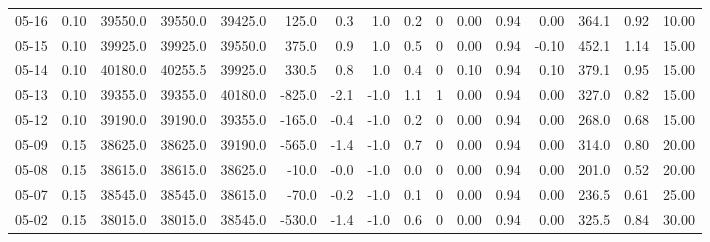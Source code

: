 \begin{threeparttable}
{\begin{tabular}{lrrrrrrrrrrrrrrr}
  05-16 &     0.10 & 39550.0 & 39550.0 & 39425.0 &      125.0 &            0.3 &                      1.0 &                 0.2 &              0 &       0.00 &      0.94 &           0.00 &            364.1 &            0.92 &                  10.00 \\
  05-15 &     0.10 & 39925.0 & 39925.0 & 39550.0 &      375.0 &            0.9 &                      1.0 &                 0.5 &              0 &       0.00 &      0.94 &          -0.10 &            452.1 &            1.14 &                  15.00 \\
  05-14 &     0.10 & 40180.0 & 40255.5 & 39925.0 &      330.5 &            0.8 &                      1.0 &                 0.4 &              0 &       0.10 &      0.94 &           0.10 &            379.1 &            0.95 &                  15.00 \\
  05-13 &     0.10 & 39355.0 & 39355.0 & 40180.0 &     -825.0 &           -2.1 &                     -1.0 &                 1.1 &              1 &       0.00 &      0.94 &           0.00 &            327.0 &            0.82 &                  15.00 \\
  05-12 &     0.10 & 39190.0 & 39190.0 & 39355.0 &     -165.0 &           -0.4 &                     -1.0 &                 0.2 &              0 &       0.00 &      0.94 &           0.00 &            268.0 &            0.68 &                  15.00 \\
  05-09 &     0.15 & 38625.0 & 38625.0 & 39190.0 &     -565.0 &           -1.4 &                     -1.0 &                 0.7 &              0 &       0.00 &      0.94 &           0.00 &            314.0 &            0.80 &                  20.00 \\
  05-08 &     0.15 & 38615.0 & 38615.0 & 38625.0 &      -10.0 &           -0.0 &                     -1.0 &                 0.0 &              0 &       0.00 &      0.94 &           0.00 &            201.0 &            0.52 &                  20.00 \\
  05-07 &     0.15 & 38545.0 & 38545.0 & 38615.0 &      -70.0 &           -0.2 &                     -1.0 &                 0.1 &              0 &       0.00 &      0.94 &           0.00 &            236.5 &            0.61 &                  25.00 \\
  05-02 &     0.15 & 38015.0 & 38015.0 & 38545.0 &     -530.0 &           -1.4 &                     -1.0 &                 0.6 &              0 &       0.00 &      0.94 &           0.00 &            325.5 &            0.84 &                  30.00 \\

\end{tabular}}
\end{threeparttable}
